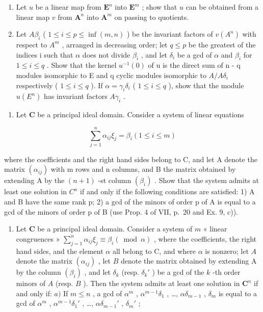 \begin{enumerate}
\def\labelenumi{\alph{enumi})}
\item
  Let \(u\) be a linear map from \(\mathbf{E}^n\) into \(\mathbf{E}^m\) ; show that \(u\) can be obtained from a linear map \(v\) from \(\mathbf{A}^n\) into \(\mathbf{A}^m\) on passing to quotients.
\item
  Let \(A\beta_{i}\) ( \(1 \leqslant i \leqslant p \leqslant \inf(m, n)\) ) be the invariant factors of \(v(A^{n})\) with respect to \(A^{m}\) , arranged in decreasing order; let \(q \leqslant p\) be the greatest of the indices i such that \(\alpha\) does not divide \(\beta_{i}\) , and let \(\delta_{i}\) be a gcd of \(\alpha\) and \(\beta_{i}\) for \(1 \leqslant i \leqslant q\) . Show that the kernel \(u^{-1}(0)\) of u is the direct sum of n - q modules isomorphic to E and q cyclic modules isomorphic to \(A/A\delta_{i}\) respectively ( \(1 \leqslant i \leqslant q\) ). If \(\alpha = \gamma_{i}\delta_{i}\) ( \(1 \leqslant i \leqslant q\) ), show that the module \(u(E^{n})\) has invariant factors \(A\gamma_{i}\) .
\end{enumerate}

\begin{enumerate}
\def\labelenumi{\arabic{enumi})}
\setcounter{enumi}{17}
\tightlist
\item
  Let \(\mathbf{C}\) be a principal ideal domain. Consider a system of linear equations
\end{enumerate}

\[
\sum_ {j = 1} ^ {n} \alpha_ {i j} \xi_ {j} = \beta_ {i} (1 \leqslant i \leqslant m)
\]

where the coefficients and the right hand sides belong to C, and let A denote the matrix \((\alpha_{ij})\) with m rows and n columns, and B the matrix obtained by extending A by the \((n+1)\) -st column \((\beta_{i})\) . Show that the system admits at least one solution in \(C^{n}\) if and only if the following conditions are satisfied: 1) A and B have the same rank p; 2) a gcd of the minors of order p of A is equal to a gcd of the minors of order p of B (use Prop. 4 of VII, p.~20 and Ex. 9, c)).

\begin{enumerate}
\def\labelenumi{\arabic{enumi})}
\setcounter{enumi}{18}
\tightlist
\item
  Let \(\mathbf{C}\) be a principal ideal domain. Consider a system of \(m\) « linear congruences » \(\sum_{j=1}^{n} \alpha_{ij} \xi_j \equiv \beta_i (\bmod \alpha)\) , where the coefficients, the right hand sides, and the element \(\alpha\) all belong to C, and where \(\alpha\) is nonzero; let \(A\) denote the matrix \((\alpha_{ij})\) , let \(B\) denote the matrix obtained by extending A by the column \((\beta_i)\) , and let \(\delta_k\) (resp. \(\delta_k'\) ) be a gcd of the \(k\) -th order minors of \(A\) (resp. \(B\) ). Then the system admits at least one solution in \(\mathbf{C}^n\) if and only if: \(a)\) If \(m \leqslant n\) , a gcd of \(\alpha^m\) , \(\alpha^{m-1}\delta_1\) , \ldots, \(\alpha\delta_{m-1}\) , \(\delta_m\) is equal to a gcd of \(\alpha^m\) , \(\alpha^{m-1}\delta_1'\) , \ldots, \(\alpha\delta_{m-1}'\) , \(\delta_m'\) ;
\end{enumerate}

